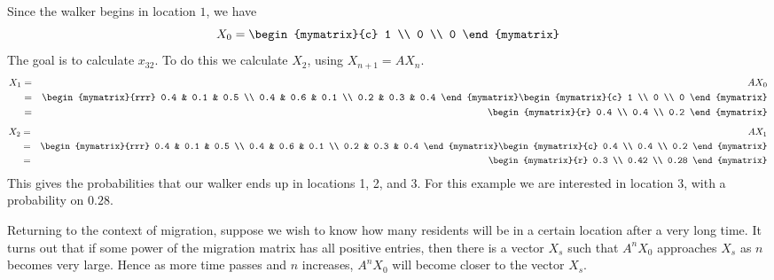 \begin{solution}
Since the walker begins in location $1$, we have 
\[
X_{0} = \begin{mymatrix}{c}
1 \\
0 \\
0
\end{mymatrix}
\]
The goal is to calculate $x_{32}$. To do this we calculate $X_{2}$, using $X_{n+1} = AX_{n}$.
\begin{eqnarray*}
X_{1} &=& A X_{0} \\
&=& \begin{mymatrix}{rrr}
0.4 & 0.1 & 0.5 \\
0.4 & 0.6 & 0.1 \\
0.2 & 0.3 & 0.4
\end{mymatrix} \begin{mymatrix}{c}
1 \\
0 \\
0
\end{mymatrix} \\
&=& 
\begin{mymatrix}{r}
0.4 \\
0.4 \\
0.2
\end{mymatrix} \\
\end{eqnarray*}
\begin{eqnarray*}
X_{2} &=& A X_{1} \\
&=& \begin{mymatrix}{rrr}
0.4 & 0.1 & 0.5 \\
0.4 & 0.6 & 0.1 \\
0.2 & 0.3 & 0.4
\end{mymatrix} \begin{mymatrix}{c}
0.4 \\
0.4 \\
0.2
\end{mymatrix} \\
&=& 
\begin{mymatrix}{r}
0.3 \\
0.42 \\
0.28
\end{mymatrix} \\
\end{eqnarray*}
This gives the probabilities that our walker ends up in locations 1, 2, and 3. For this example we are interested in location 3, with a probability on $0.28$.
\end{solution}

Returning to the context of migration, suppose we wish to know how many residents will be in a certain location
after a very long time. It turns out that if some power of the
migration matrix has all positive entries, then there is a vector $X_s$ such that $A^{n}X_{0}$ approaches $X_s$ as $n$ becomes very large. Hence as more time passes and $n$ increases, $A^{n}X_{0}$ will become closer to the vector $X_s$. 


